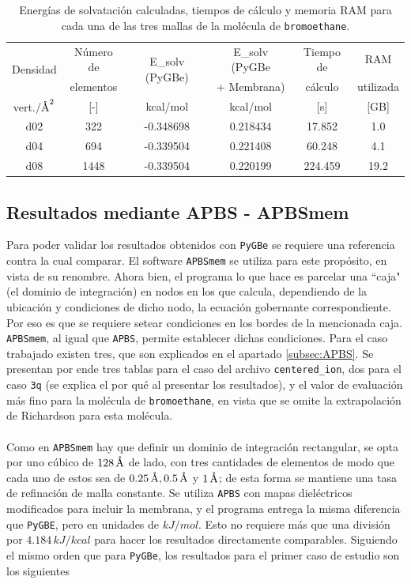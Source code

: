 \documentclass[12pt, twoside, onehalfspace, numbers, spanish]{ezthesis}
\numberwithin{equation}{section}
\newcommand{\angstrom}{\text{\normalfont\AA}}
\begin{document}
\begin{table}[h]
	\centering
	\caption{Energías de solvatación calculadas, tiempos de cálculo y memoria RAM para cada una de las tres mallas de la molécula de \texttt{bromoethane}.}
	\def\arraystretch{1.2}
	\begin{tabular}{|cccccc|}\hline
		\multirow{2}{*}{Densidad} & Número de & \multirow{2}{*}{E\_solv (PyGBe)} & E\_solv (PyGBe & Tiempo de & RAM\\
		& elementos &  & + Membrana) & cálculo & utilizada\\\hline
		\rule{0pt}{15pt} vert.$/\angstrom^2$ & [-] & kcal/mol & kcal/mol & [s] & [GB] \\\hline
		d02 & 322 & -0.348698 & 0.218434 & 17.852 & 1.0\\
		d04 & 694 & -0.339504 & 0.221408 & 60.248 & 4.1\\
		d08 & 1448 & -0.339504 & 0.220199 & 224.459 & 19.2\\ \hline
	\end{tabular}\label{table:pygbe_bromoethane}
\end{table}


\subsection{Resultados mediante APBS - APBSmem}\label{subsec:resultados_apbs}

Para poder validar los resultados obtenidos con \texttt{PyGBe} se requiere una referencia contra la cual comparar. El software \texttt{APBSmem} se utiliza para este propósito, en vista de su renombre. Ahora bien, el programa lo que hace es parcelar una ``caja" (el dominio de integración) en nodos en los que calcula, dependiendo de la ubicación y condiciones de dicho nodo, la ecuación gobernante correspondiente. Por eso es que se requiere setear condiciones en los bordes de la mencionada caja. \texttt{APBSmem}, al igual que \texttt{APBS}, permite establecer dichas condiciones. Para el caso trabajado existen tres, que son explicados en el apartado \ref{subsec:APBS}. Se presentan por ende tres tablas para el caso del archivo \texttt{centered\_ion}, dos para el caso \texttt{3q} (se explica el por qué al presentar los resultados), y el valor de evaluación más fino para la molécula de \texttt{bromoethane}, en vista que se omite la extrapolación de Richardson para esta molécula.\\\\
Como en \texttt{APBSmem} hay que definir un dominio de integración rectangular, se opta por uno cúbico de $128\,\angstrom$ de lado, con tres cantidades de elementos de modo que cada uno de estos sea de $0.25\,\angstrom, 0.5\,\angstrom$ y $1\,\angstrom$; de esta forma se mantiene una tasa de refinación de malla constante. Se utiliza \texttt{APBS} con mapas dieléctricos modificados para incluir la membrana, y el programa entrega la misma diferencia que \texttt{PyGBE}, pero en unidades de $kJ/mol$. Esto no requiere más que una división por $4.184\, kJ/kcal$ para hacer los resultados directamente comparables. Siguiendo el mismo orden que para \texttt{PyGBe}, los resultados para el primer caso de estudio son los siguientes
\end{document}
